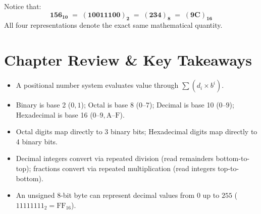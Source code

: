 \begin{example}
Notice that:
\[
\mathbf{156_{10}} \;=\; \mathbf{(10011100)_2} \;=\; \mathbf{(234)_8} \;=\; \mathbf{(9\text{C})_{16}}
\]
All four representations denote the exact same mathematical quantity.
\end{example}

\section{Chapter Review \& Key Takeaways}
\begin{tcolorbox}[enhanced, colback=boxgreenbg, colframe=boxgreenborder, boxrule=1pt, arc=4pt, title={\bfseries\sffamily Summary Checklist}]
\sffamily\small
\begin{itemize}[leftmargin=1.2em, itemsep=2pt]
    \item A positional number system evaluates value through $\sum (d_i \times b^i)$.
    \item Binary is base 2 ($0,1$); Octal is base 8 ($0\text{--}7$); Decimal is base 10 ($0\text{--}9$); Hexadecimal is base 16 ($0\text{--}9, \text{A}\text{--}\text{F}$).
    \item Octal digits map directly to 3 binary bits; Hexadecimal digits map directly to 4 binary bits.
    \item Decimal integers convert via repeated division (read remainders bottom-to-top); fractions convert via repeated multiplication (read integers top-to-bottom).
    \item An unsigned 8-bit byte can represent decimal values from $0$ up to $255$ ($11111111_2 = \text{FF}_{16}$).
\end{itemize}
\end{tcolorbox}
